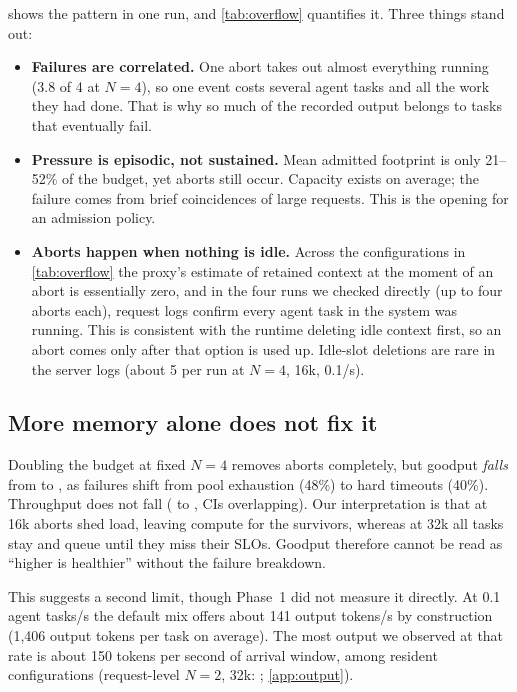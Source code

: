  shows the pattern in one run, and \cref{tab:overflow} quantifies it. Three things stand out:
\begin{itemize}
  \item \textbf{Failures are correlated.} One abort takes out almost everything running (3.8 of 4 at $N=4$), so one event costs several agent tasks and all the work they had done. That is why so much of the recorded output belongs to tasks that eventually fail.
  \item \textbf{Pressure is episodic, not sustained.} Mean admitted footprint is only 21--52\% of the budget, yet aborts still occur. Capacity exists on average; the failure comes from brief coincidences of large requests. This is the opening for an admission policy.
  \item \textbf{Aborts happen when nothing is idle.} Across the configurations in \cref{tab:overflow} the proxy's estimate of retained context at the moment of an abort is essentially zero, and in the four runs we checked directly (up to four aborts each), request logs confirm every agent task in the system was running. This is consistent with the runtime deleting idle context first, so an abort comes only after that option is used up. Idle-slot deletions are rare in the server logs (about 5 per run at $N=4$, 16k, 0.1/s).
\end{itemize}

\subsection{More memory alone does not fix it}\label{sec:budget}

Doubling the budget at fixed $N=4$ removes aborts completely, but goodput \emph{falls} from  to , as failures shift from pool exhaustion (48\%) to hard timeouts (40\%). Throughput does not fall ( to , CIs overlapping). Our interpretation is that at 16k aborts shed load, leaving compute for the survivors, whereas at 32k all tasks stay and queue until they miss their SLOs. Goodput therefore cannot be read as ``higher is healthier'' without the failure breakdown.

This suggests a second limit, though Phase~1 did not measure it directly. At 0.1 agent tasks/s the default mix offers about 141 output tokens/s by construction (1,406 output tokens per task on average). The most output we observed at that rate is about 150 tokens per second of arrival window, among resident configurations (request-level $N=2$, 32k: ; \cref{app:output}).

